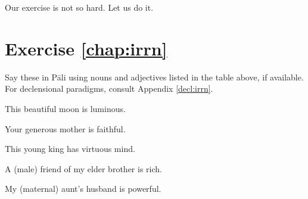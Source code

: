 
Our exercise is not so hard. Let us do it.

\section*{Exercise \ref{chap:irrn}}
Say these in P\=ali using nouns and adjectives listed in the table above, if available. For declensional paradigms, consult Appendix \ref{decl:irrn}.
\begin{compactenum}
\item This beautiful moon is luminous. 
\item Your generous mother is faithful.
\item This young king has virtuous mind.
\item A (male) friend of my elder brother is rich.
\item My (maternal) aunt's husband is powerful.
\end{compactenum}
